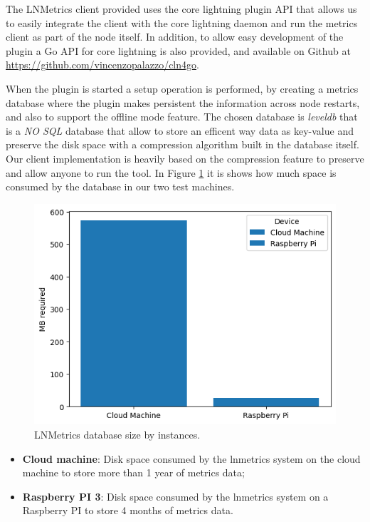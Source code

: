 The LNMetrics client provided uses the core lightning plugin API
that allows us to easily integrate the client with the core lightning daemon 
and run the metrics client as part of the node itself. 
In addition, to allow easy development of the plugin a 
Go API for core lightning is also provided, and available on 
Github at \url{https://github.com/vincenzopalazzo/cln4go}.

When the plugin is started a setup operation is performed, by creating a 
metrics database where the plugin makes persistent the information 
across node restarts, and also to support the offline mode feature. 
The chosen database is \emph{leveldb} that is a \emph{NO SQL} database 
that allow to store an efficent way data as key-value and preserve
the disk space with a compression algorithm built in the database itself.
Our client implementation is heavily based on the 
compression feature to preserve and allow anyone to 
run the tool. 
In Figure \ref{fig:lnmetrics_diskspace} it is shows how much space is 
consumed by the database in our two test machines. 

\begin{figure}
    \begin{center}
    \includegraphics[scale=0.7]{imgs/disk_space_servers.png}
    \end{center}
    \caption{LNMetrics database size by instances.}
    \label{fig:lnmetrics_diskspace}
\end{figure}

\begin{itemize}
    \item {\bf Cloud machine}: Disk space consumed by the lnmetrics 
        system on the cloud machine to store more than 1 year of metrics data;
    \item {\bf Raspberry PI 3}: Disk space consumed by the lnmetrics system
        on a Raspberry PI to store 4 months of metrics data.
\end{itemize}

